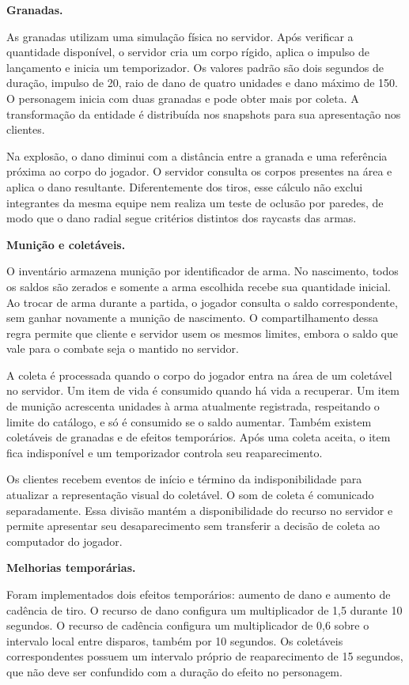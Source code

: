 \textbf{Granadas.}

As granadas utilizam uma simulação física no servidor. Após verificar a quantidade disponível, o servidor cria um corpo rígido, aplica o impulso de lançamento e inicia um temporizador. Os valores padrão são dois segundos de duração, impulso de 20, raio de dano de quatro unidades e dano máximo de 150. O personagem inicia com duas granadas e pode obter mais por coleta. A transformação da entidade é distribuída nos snapshots para sua apresentação nos clientes.

Na explosão, o dano diminui com a distância entre a granada e uma referência próxima ao corpo do jogador. O servidor consulta os corpos presentes na área e aplica o dano resultante. Diferentemente dos tiros, esse cálculo não exclui integrantes da mesma equipe nem realiza um teste de oclusão por paredes, de modo que o dano radial segue critérios distintos dos raycasts das armas.

\textbf{Munição e coletáveis.}

O inventário armazena munição por identificador de arma. No nascimento, todos os saldos são zerados e somente a arma escolhida recebe sua quantidade inicial. Ao trocar de arma durante a partida, o jogador consulta o saldo correspondente, sem ganhar novamente a munição de nascimento. O compartilhamento dessa regra permite que cliente e servidor usem os mesmos limites, embora o saldo que vale para o combate seja o mantido no servidor.

A coleta é processada quando o corpo do jogador entra na área de um coletável no servidor. Um item de vida é consumido quando há vida a recuperar. Um item de munição acrescenta unidades à arma atualmente registrada, respeitando o limite do catálogo, e só é consumido se o saldo aumentar. Também existem coletáveis de granadas e de efeitos temporários. Após uma coleta aceita, o item fica indisponível e um temporizador controla seu reaparecimento.

Os clientes recebem eventos de início e término da indisponibilidade para atualizar a representação visual do coletável. O som de coleta é comunicado separadamente. Essa divisão mantém a disponibilidade do recurso no servidor e permite apresentar seu desaparecimento sem transferir a decisão de coleta ao computador do jogador.

\textbf{Melhorias temporárias.}

Foram implementados dois efeitos temporários: aumento de dano e aumento de cadência de tiro. O recurso de dano configura um multiplicador de 1,5 durante 10 segundos. O recurso de cadência configura um multiplicador de 0,6 sobre o intervalo local entre disparos, também por 10 segundos. Os coletáveis correspondentes possuem um intervalo próprio de reaparecimento de 15 segundos, que não deve ser confundido com a duração do efeito no personagem.

